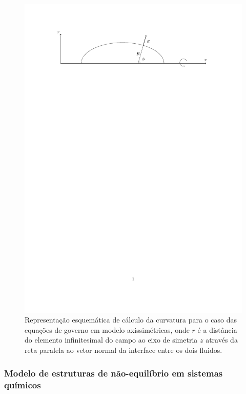 \documentclass[a4paper,portuges,12pt]{article}
\begin{document}
 \begin{figure}[h!]
 	\begin{center}
 		\includegraphics[angle=0, scale=0.5]{figs/axisymmetric.pdf}
 	\end{center}
	\caption{Representação esquemática de cálculo da curvatura para o
	caso das equações de governo em modelo axissimétricas, onde $r$ é a
	distância do elemento infinitesimal do campo ao eixo de simetria $z$
	através da reta paralela ao vetor normal da interface entre os dois
	fluidos. }
 	\label{fig:axisymmetric} 
 \end{figure}

\subsubsection{Modelo de estruturas de não-equilíbrio em sistemas
químicos}
\end{document}
